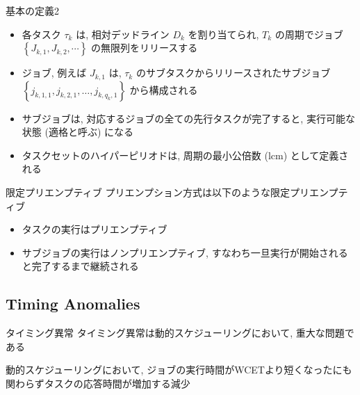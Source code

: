 \begin{frame}{基本の定義2}
    \begin{itemize}
        \item 各タスク $\tau_{k}$ は, 相対デッドライン $D_{k}$ を割り当てられ, $T_{k}$ の周期でジョブ $\left\{J_{k, 1}, J_{k, 2}, \cdots\right\}$ の無限列をリリースする
        \item ジョブ, 例えば $J_{k, 1}$ は, $\tau_{k}$ のサブタスクからリリースされたサブジョブ $\left\{j_{k, 1,1}, j_{k, 2,1}, \ldots, j_{k, q_{k}, 1}\right\}$ から構成される
        \item サブジョブは, 対応するジョブの全ての先行タスクが完了すると, 実行可能な状態 (適格と呼ぶ) になる
        \item タスクセットのハイパーピリオドは, 周期の最小公倍数 (lcm) として定義される
    \end{itemize}
\end{frame}

\begin{frame}{限定プリエンプティブ}
    プリエンプション方式は以下のような限定プリエンプティブ
    \begin{itemize}
        \item タスクの実行はプリエンプティブ
        \item サブジョブの実行はノンプリエンプティブ, すなわち一旦実行が開始されると完了するまで継続される
    \end{itemize}
\end{frame}


\subsection{Timing Anomalies}
\label{ssec: Timing Anomalies}

\begin{frame}{タイミング異常}
    タイミング異常は動的スケジューリングにおいて, 重大な問題である
    \begin{definition}[タイミング異常]
        動的スケジューリングにおいて, ジョブの実行時間がWCETより短くなったにも関わらずタスクの応答時間が増加する減少
    \end{definition}
\end{frame}

